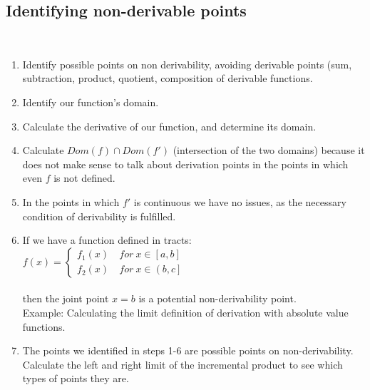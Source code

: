 \documentclass[a4paper]{report}
\begin{document}
\subsection{Identifying non-derivable points}
 \\ 
\begin{enumerate}
    \item Identify possible points on non derivability, avoiding derivable points (sum, subtraction, product, quotient, composition of derivable functions.
    \item Identify our function's domain.
    \item Calculate the derivative of our function, and determine its domain.
    \item Calculate $Dom\left ( f \right )\cap Dom\left ( f' \right )$ (intersection of the two domains) because it does not make sense to talk about derivation points in the points in which even $f$ is not defined.
    \item In the points in which $f'$ is continuous we have no issues, as the necessary condition of derivability is fulfilled.
    \item If we have a function defined in tracts:\\
    $f\left ( x \right )=\left\{\begin{matrix}
f_{1}\left ( x \right ) &\ for\ x\in\left [ a,b \right ] \\ 
f_{2}\left ( x \right ) &\ for\ x\in\left ( b,c \right ]
\end{matrix}\right.$\\\\
    then the joint point $x=b$ is a potential non-derivability point.\\Example: Calculating the limit definition of derivation with absolute value functions.
    \item The points we identified in steps 1-6 are possible points on non-derivability. Calculate the left and right limit of the incremental product to see which types of points they are.
\end{enumerate}
\end{document}
